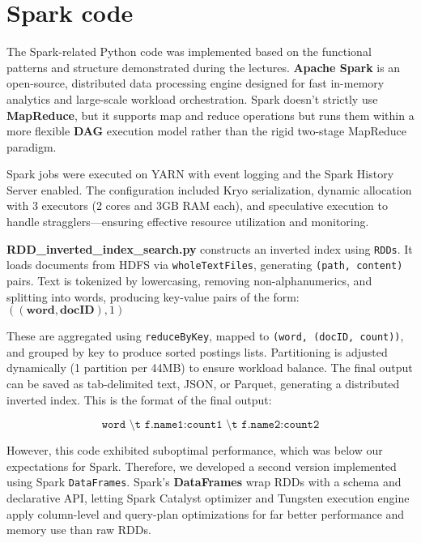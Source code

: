 \section{Spark code}
The Spark-related Python code was implemented based on the functional patterns and structure demonstrated during the lectures. \textbf{Apache Spark} is an open-source, distributed data processing engine designed for fast in-memory analytics and large-scale workload orchestration. Spark doesn’t strictly use \textbf{MapReduce}, but it supports map and reduce operations but runs them within a more flexible \textbf{DAG} execution model rather than the rigid two-stage MapReduce paradigm.

\vspace{4mm}

Spark jobs were executed on YARN with event logging and the Spark History Server enabled. The configuration included Kryo serialization, dynamic allocation with 3 executors (2 cores and 3GB RAM each), and speculative execution to handle stragglers—ensuring effective resource utilization and monitoring.

\vspace{4mm}

\textbf{RDD\_inverted\_index\_search.py} constructs an inverted index using \texttt{RDDs}. It loads documents from HDFS via \texttt{wholeTextFiles}, generating \texttt{(path, content)} pairs. Text is tokenized by lowercasing, removing non-alphanumerics, and splitting into words, producing key-value pairs of the form: $ ((\textbf{word}, \textbf{docID}), 1) $

These are aggregated using \texttt{reduceByKey}, mapped to \texttt{(word, (docID, count))}, and grouped by key to produce sorted postings lists. Partitioning is adjusted dynamically (1 partition per 44MB) to ensure workload balance. The final output can be saved as tab-delimited text, JSON, or Parquet, generating a distributed inverted index. This is the format of the final output:

\[
\texttt{word \textbackslash t f.name1:count1 \textbackslash t f.name2:count2}
\]

However, this code exhibited suboptimal performance, which was below our expectations for Spark. Therefore, we developed a second version implemented using Spark \texttt{DataFrames}. Spark's \textbf{DataFrames} wrap RDDs with a schema and declarative API, letting Spark Catalyst optimizer and Tungsten execution engine apply column-level and query-plan optimizations for far better performance and memory use than raw RDDs. 

